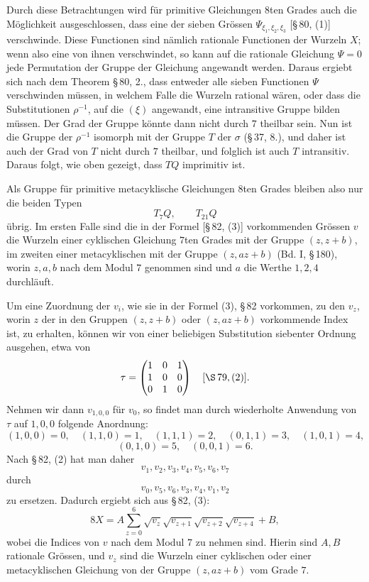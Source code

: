 \documentclass[11pt]{article}
\providecommand{\mmat}[9]{\begin{pmatrix}#1&#2&#3\\#4&#5&#6\\#7&#8&#9\end{pmatrix}}
\providecommand{\mmat}[9]{\begin{pmatrix}#1&#2&#3\\#4&#5&#6\\#7&#8&#9\end{pmatrix}}
\begin{document}
Durch diese Betrachtungen wird für primitive Gleichungen $8$ten Grades auch die Möglichkeit ausgeschlossen, dass eine der sieben Grössen $\Psi_{\xi_1,\xi_2,\xi_3}$ [\S\,80, (1)] verschwinde. Diese Functionen sind nämlich rationale Functionen der Wurzeln $X$; wenn also eine von ihnen verschwindet, so kann auf die rationale Gleichung $\Psi=0$ jede Permutation der Gruppe der Gleichung angewandt werden. Daraus ergiebt sich nach dem Theorem \S\,80, 2., dass entweder alle sieben Functionen $\Psi$ verschwinden müssen, in welchem Falle die Wurzeln rational wären, oder dass die Substitutionen $\rho^{-1}$, auf die $(\xi)$ angewandt, eine intransitive Gruppe bilden müssen. Der Grad der Gruppe könnte dann nicht durch $7$ theilbar sein. Nun ist die Gruppe der $\rho^{-1}$ isomorph mit der Gruppe $T$ der $\sigma$ (\S\,37, 8.), und daher ist auch der Grad von $T$ nicht durch $7$ theilbar, und folglich ist auch $T$ intransitiv. Daraus folgt, wie oben gezeigt, dass $TQ$ imprimitiv ist.

Als Gruppe für primitive metacyklische Gleichungen $8$ten Grades bleiben also nur die beiden Typen
\[
 T_7Q,
 \qquad T_{21}Q
\]
übrig. Im ersten Falle sind die in der Formel [\S\,82, (3)] vorkommenden Grössen $v$ die Wurzeln einer cyklischen Gleichung $7$ten Grades mit der Gruppe $(z,z+b)$, im zweiten einer metacyklischen mit der Gruppe $(z,az+b)$ (Bd. I, \S\,180), worin $z,a,b$ nach dem Modul $7$ genommen sind und $a$ die Werthe $1,2,4$ durchläuft.

Um eine Zuordnung der $v_i$, wie sie in der Formel (3), \S\,82 vorkommen, zu den $v_z$, worin $z$ der in den Gruppen $(z,z+b)$ oder $(z,az+b)$ vorkommende Index ist, zu erhalten, können wir von einer beliebigen Substitution siebenter Ordnung ausgehen, etwa von
\[
 \tau=\mmat{1}{0}{1}{1}{0}{0}{0}{1}{0}\quad [\S\,79,(2)].
\]
Nehmen wir dann $v_{1,0,0}$ für $v_0$, so findet man durch wiederholte Anwendung von $\tau$ auf $1,0,0$ folgende Anordnung:
\[
 (1,0,0)=0,
 \quad (1,1,0)=1,
 \quad (1,1,1)=2,
 \quad (0,1,1)=3,
 \quad (1,0,1)=4,
\]
\[
 (0,1,0)=5,
 \quad (0,0,1)=6.
\]
Nach \S\,82, (2) hat man daher
\[
 v_1,v_2,v_3,v_4,v_5,v_6,v_7
\]
durch
\[
 v_0,v_5,v_6,v_3,v_4,v_1,v_2
\]
zu ersetzen. Dadurch ergiebt sich aus \S\,82, (3):
\begin{equation}
 8X=A\sum_{z=0}^{6}\sqrt{v_z}\sqrt{v_{z+1}}\sqrt{v_{z+2}}\sqrt{v_{z+4}}+B,
 \tag{5}
\end{equation}
wobei die Indices von $v$ nach dem Modul $7$ zu nehmen sind. Hierin sind $A,B$ rationale Grössen, und $v_z$ sind die Wurzeln einer cyklischen oder einer metacyklischen Gleichung von der Gruppe $(z,az+b)$ vom Grade $7$.
\end{document}
